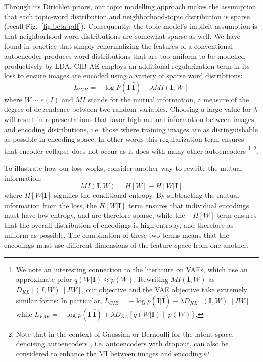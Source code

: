 Through its Dirichlet priors, our topic modelling approach makes the assumption that each topic-word distribution and neighborhood-topic distribution is sparse (recall Fig.~\ref{fig:beta-pdf}). Consequently, the topic model's implicit assumption is that neighborhood-word distributions are somewhat sparse as well.
We have found in practice that simply renormalizing the features of a conventional autoencoder produces word-distributions that are too uniform to be modelled productively by LDA. CIB-AE employs an additional regularization term in its loss to ensure images are encoded using a variety of sparse word distribtions:
\begin{equation}
    L_{CIB} = -\log P(\mathbf{I} | \mathbf{\hat{I}}) - \lambda MI\left(\mathbf{I}, W\right)
\end{equation}
where $W \sim e(I)$ and $MI$ stands for the mutual information, a measure of the degree of dependence between two random variables. Choosing a large value for $\lambda$ will result in representations that favor high mutual information between images and encoding distributions, i.e. those where training images are as distinguishable as possible in encoding space. In other words this regularization term ensures that encoder collapse does not occur as it does with many other autoencoders \footnote{We note an interesting connection to the literature on VAEs, which use an approximate prior $q(W|\mathbf{I}) \approx p(W)$. Rewriting $MI\left(\mathbf{I}, W\right)$ as $D_{KL}[(I,W) \| IW ]$, our objective and the VAE objective take extremely similar forms: In particular, $L_{CIB} = -\log p(\mathbf{I} | \mathbf{\hat{I}}) - \lambda D_{KL}[(\mathbf{I},W) \| IW ]$ while $L_{VAE} = -\log p(\mathbf{I} | \mathbf{\hat{I}}) + \lambda D_{KL}[q(W|\mathbf{I}) \| p(W) ]$.} \footnote{Note that in the context of Gaussian or Bernoulli for the latent space, denoising autoencoders \citep{vincent2010stacked}, i.e. autoencoders with dropout, can also be considered to enhance the MI between images and encoding.}.

To illustrate how our loss works, consider another way to rewrite the mutual information:
\begin{equation}
MI\left(\mathbf{I}, W\right) = H[W] - H[W | \mathbf{I}]
\end{equation}
where $H[W | \mathbf{I}]$ signifies the conditional entropy. By subtracting the mutual information from the loss, the $H[W | \mathbf{I}]$ term ensures that individual encodings must have low entropy, and are therefore sparse, while the $-H[W]$ term ensures that the overall distribution of encodings is high entropy, and therefore as uniform as possible. The combination of these two terms means that the encodings must use different dimensions of the feature space from one another.

